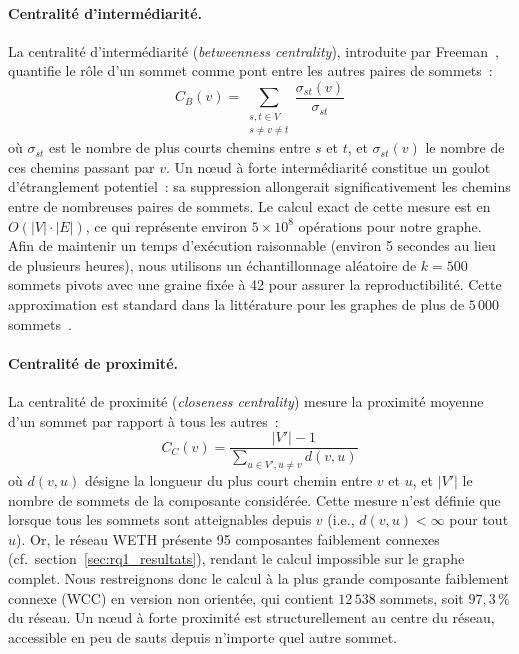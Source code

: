 \paragraph{Centralit\'e d'interm\'ediarit\'e.}
La centralit\'e d'interm\'ediarit\'e (\textit{betweenness centrality}), introduite par Freeman~\cite{freeman1977centrality}, quantifie le r\^ole d'un sommet comme pont entre les autres paires de sommets~:
\begin{equation}
C_B(v) = \sum_{\substack{s,t \in V \\ s \neq v \neq t}} \frac{\sigma_{st}(v)}{\sigma_{st}}
\label{eq:betweenness}
\end{equation}
o\`u $\sigma_{st}$ est le nombre de plus courts chemins entre $s$ et $t$, et $\sigma_{st}(v)$ le nombre de ces chemins passant par $v$. Un n\oe{}ud \`a forte interm\'ediarit\'e constitue un goulot d'\'etranglement potentiel~: sa suppression allongerait significativement les chemins entre de nombreuses paires de sommets. Le calcul exact de cette mesure est en $O(|V| \cdot |E|)$, ce qui repr\'esente environ $5 \times 10^8$ op\'erations pour notre graphe. Afin de maintenir un temps d'ex\'ecution raisonnable (environ 5 secondes au lieu de plusieurs heures), nous utilisons un \'echantillonnage al\'eatoire de $k = 500$ sommets pivots avec une graine fix\'ee \`a 42 pour assurer la reproductibilit\'e. Cette approximation est standard dans la litt\'erature pour les graphes de plus de $5\,000$ sommets~\cite{newman2018networks}.

\paragraph{Centralit\'e de proximit\'e.}
La centralit\'e de proximit\'e (\textit{closeness centrality}) mesure la proximit\'e moyenne d'un sommet par rapport \`a tous les autres~:
\begin{equation}
C_C(v) = \frac{|V'|-1}{\displaystyle\sum_{u \in V', u \neq v} d(v,u)}
\label{eq:closeness}
\end{equation}
o\`u $d(v,u)$ d\'esigne la longueur du plus court chemin entre $v$ et $u$, et $|V'|$ le nombre de sommets de la composante consid\'er\'ee. Cette mesure n'est d\'efinie que lorsque tous les sommets sont atteignables depuis $v$ (i.e., $d(v,u) < \infty$ pour tout $u$). Or, le r\'eseau WETH pr\'esente 95 composantes faiblement connexes (cf.~section~\ref{sec:rq1_resultats}), rendant le calcul impossible sur le graphe complet. Nous restreignons donc le calcul \`a la plus grande composante faiblement connexe (WCC) en version non orient\'ee, qui contient $12\,538$ sommets, soit $97{,}3\,\%$ du r\'eseau. Un n\oe{}ud \`a forte proximit\'e est structurellement \og au centre \fg{} du r\'eseau, accessible en peu de sauts depuis n'importe quel autre sommet.

